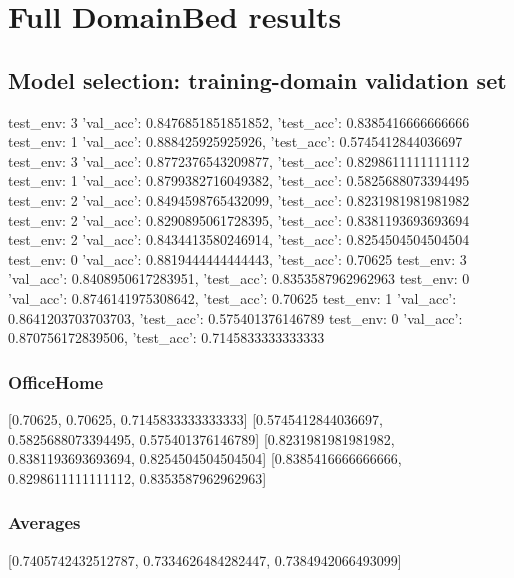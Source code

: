 \documentclass{article}
\begin{document}
\section{Full DomainBed results}

\subsection{Model selection: training-domain validation set}
test_env: 3
{'val_acc': 0.8476851851851852, 'test_acc': 0.8385416666666666}
test_env: 1
{'val_acc': 0.888425925925926, 'test_acc': 0.5745412844036697}
test_env: 3
{'val_acc': 0.8772376543209877, 'test_acc': 0.8298611111111112}
test_env: 1
{'val_acc': 0.8799382716049382, 'test_acc': 0.5825688073394495}
test_env: 2
{'val_acc': 0.8494598765432099, 'test_acc': 0.8231981981981982}
test_env: 2
{'val_acc': 0.8290895061728395, 'test_acc': 0.8381193693693694}
test_env: 2
{'val_acc': 0.8434413580246914, 'test_acc': 0.8254504504504504}
test_env: 0
{'val_acc': 0.8819444444444443, 'test_acc': 0.70625}
test_env: 3
{'val_acc': 0.8408950617283951, 'test_acc': 0.8353587962962963}
test_env: 0
{'val_acc': 0.8746141975308642, 'test_acc': 0.70625}
test_env: 1
{'val_acc': 0.8641203703703703, 'test_acc': 0.575401376146789}
test_env: 0
{'val_acc': 0.870756172839506, 'test_acc': 0.7145833333333333}

\subsubsection{OfficeHome}
[0.70625, 0.70625, 0.7145833333333333]
[0.5745412844036697, 0.5825688073394495, 0.575401376146789]
[0.8231981981981982, 0.8381193693693694, 0.8254504504504504]
[0.8385416666666666, 0.8298611111111112, 0.8353587962962963]

\begin{center}
\end{center}

\subsubsection{Averages}
[0.7405742432512787, 0.7334626484282447, 0.7384942066493099]

\begin{center}
\end{center}
\end{document}
